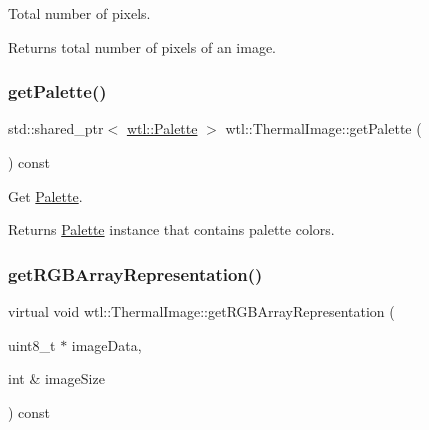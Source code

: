 Total number of pixels. 

\begin{DoxyReturn}{Returns}
total number of pixels of an image. 
\end{DoxyReturn}
\mbox{\label{classwtl_1_1_thermal_image_a87ec0327e8fa2281caefb4ff3f67e42f}} 
\subsubsection{\texorpdfstring{get\+Palette()}{getPalette()}}
{\footnotesize\ttfamily std\+::shared\+\_\+ptr$<$ \hyperlink{classwtl_1_1_palette}{wtl\+::\+Palette} $>$ wtl\+::\+Thermal\+Image\+::get\+Palette (\begin{DoxyParamCaption}{ }\end{DoxyParamCaption}) const}



Get \hyperlink{classwtl_1_1_palette}{Palette}. 

\begin{DoxyReturn}{Returns}
\hyperlink{classwtl_1_1_palette}{Palette} instance that contains palette colors. 
\end{DoxyReturn}
\mbox{\label{classwtl_1_1_thermal_image_ae19943330497206817cda3557c4a0725}} 
\subsubsection{\texorpdfstring{get\+R\+G\+B\+Array\+Representation()}{getRGBArrayRepresentation()}}
{\footnotesize\ttfamily virtual void wtl\+::\+Thermal\+Image\+::get\+R\+G\+B\+Array\+Representation (\begin{DoxyParamCaption}\item[{uint8\+\_\+t $\ast$}]{image\+Data,  }\item[{int \&}]{image\+Size }\end{DoxyParamCaption}) const\hspace{0.3cm}{\ttfamily [pure virtual]}}




